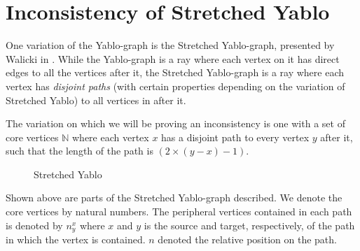 \section{Inconsistency of Stretched Yablo}
\label{sec:Inconsistency of Stretched Yablo}
One variation of the Yablo-graph is the Stretched Yablo-graph, presented by Walicki in \cite{michal-completeness}.
While the Yablo-graph is a ray where each vertex on it has direct edges to all the vertices after it, the Stretched Yablo-graph is a ray where each vertex has \textit{disjoint paths} (with certain properties depending on the variation of Stretched Yablo) to all vertices in after it.

The variation on which we will be proving an inconsistency is one with a set of core vertices $\mathbb{N}$ where each vertex $x$ has a disjoint path to every vertex $y$ after it, such that the length of the path is $(2 \times (y - x) - 1)$.

\begin{figure}[!h]
  \centering
  \caption{Stretched Yablo}
  \label{fig:stretched_yablo}
\end{figure}
Shown above are parts of the Stretched Yablo-graph described.
We denote the core vertices by natural numbers.
The peripheral vertices contained in each path is denoted by $n^x_y$ where $x$ and $y$ is the source and target, respectively, of the path in which the vertex is contained.
$n$ denoted the relative position on the path.

